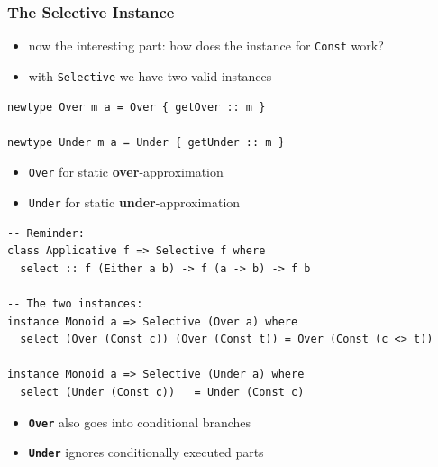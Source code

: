 \documentclass[aspectratio=169]{beamer}
\begin{document}
\begin{frame}[fragile,t]
  \frametitle{The Selective Instance}
    \begin{itemize}
  \item now the interesting part: how does the instance for \texttt{Const} work?
  \item with \texttt{Selective} we have two valid instances
  \end{itemize}
  \vfill
  \begin{verbatim}
newtype Over m a = Over { getOver :: m }

newtype Under m a = Under { getUnder :: m }
  \end{verbatim}
  \vfill
  \begin{itemize}
  \item \texttt{Over} for static \textbf{over}-approximation
  \item \texttt{Under} for static \textbf{under}-approximation
  \end{itemize}
\end{frame}

\begin{frame}[fragile]
  \begin{verbatim}
-- Reminder:
class Applicative f => Selective f where
  select :: f (Either a b) -> f (a -> b) -> f b

-- The two instances:
instance Monoid a => Selective (Over a) where
  select (Over (Const c)) (Over (Const t)) = Over (Const (c <> t))

instance Monoid a => Selective (Under a) where
  select (Under (Const c)) _ = Under (Const c)
  \end{verbatim}
  \vfill
  \begin{itemize}
  \item \textbf{\texttt{Over}} also goes into conditional branches
  \item \textbf{\texttt{Under}} ignores conditionally executed parts
  \end{itemize}
\end{frame}
\end{document}
